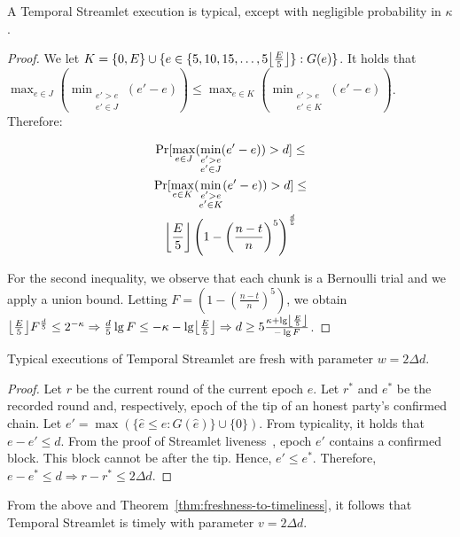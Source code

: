 \begin{lemma} \label{lem:honest-quintuple}
  A Temporal Streamlet execution is typical, except with negligible probability in $\kappa$.
\end{lemma}
\begin{proof}
  We let $K = \{0, E\} \cup \{e \in \{5, 10, 15, \ldots, 5\floor*{\frac{E}{5}}\}: G(e)\}$.
  It holds that
  $\max_{e \in J}(\min_{\substack{e' > e \\ e' \in J}}(e' - e)) \leq \max_{e \in K}(\min_{\substack{e' > e \\ e' \in K}}(e' - e))$.
  Therefore:

  \begin{gather*}
      \Pr [\max_{e \in J}(\min_{\substack{e' > e \\ e' \in J}}(e' - e)) > d] \leq \\
      \Pr [\max_{e \in K}(\min_{\substack{e' > e \\ e' \in K}}(e' - e)) > d] \leq \\
      \floor*{\frac{E}{5}} \left(1 - \left(\frac{n - t}{n}\right)^5\right)^{\frac{d}{5}}
  \end{gather*}

  For the second inequality, we observe that each chunk is a Bernoulli trial and we
  apply a union bound.
  Letting $F = \left(1 - \left(\frac{n - t}{n}\right)^5\right)$, we obtain
  $\floor*{\frac{E}{5}} F^{\frac{d}{5}} \leq 2^{-\kappa} \Rightarrow
   \frac{d}{5} \lg F \leq -\kappa - \lg \floor*{\frac{E}{5}} \Rightarrow
   d \geq 5\frac{\kappa + \lg \floor*{\frac{E}{5}}}{- \lg F}
  $.
  \Qed
\end{proof}

\begin{theorem} \label{thm.streamlet-freshness}
  Typical executions of Temporal Streamlet are fresh with parameter $w = 2\Delta d$.
\end{theorem}
\begin{proof}
  Let $r$ be the current round of the current epoch $e$.
  Let $r^*$ and $e^*$ be the recorded round and, respectively, epoch of the tip
  of an honest party's confirmed chain.
  Let $e' = \max(\{\hat e \leq e: G(\hat e)\} \cup \{0\})$.
  From typicality, it holds that $e - e' \leq d$.
  From the proof of Streamlet liveness~\cite[Theorem 6]{streamlet}, epoch $e'$ contains a confirmed
  block. This block cannot be after the tip.
  Hence, $e' \leq e^*$. Therefore, $e - e^* \leq d \Rightarrow r - r^* \leq 2\Delta d$.
  \Qed
\end{proof}

From the above and Theorem~\ref{thm:freshness-to-timeliness}, it follows that
Temporal Streamlet is timely with parameter $v = 2\Delta d$.
